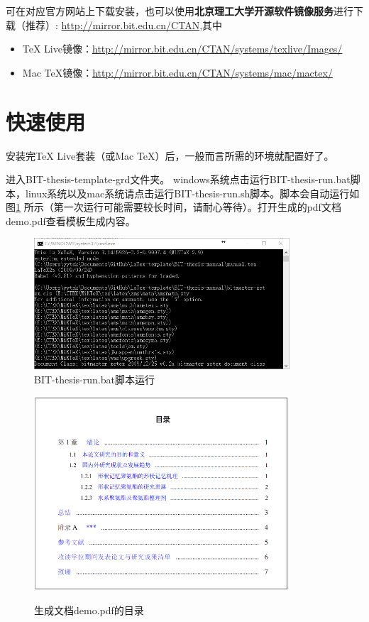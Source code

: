 可在对应官方网站上下载安装，也可以使用\textbf{北京理工大学开源软件镜像服务}进行下载（推荐）: \url{http://mirror.bit.edu.cn/CTAN},其中
\begin{itemize}
\item TeX Live镜像：\url{http://mirror.bit.edu.cn/CTAN/systems/texlive/Images/}
\item Mac TeX镜像：\url{http://mirror.bit.edu.cn/CTAN/systems/mac/mactex/}
\end{itemize}



\section{快速使用}
\label{sec:process}

安装完TeX Live套装（或Mac TeX）后，一般而言所需的环境就配置好了。

进入BIT-thesis-template-grd文件夹。
windows系统点击运行BIT-thesis-run.bat脚本，linux系统以及mac系统请点击运行BIT-thesis-run.sh脚本。脚本会自动运行如图\ref{fig:run} 所示（第一次运行可能需要较长时间，请耐心等待）。打开生成的pdf文档demo.pdf查看模板生成内容。
 
\begin{figure}[!htp]
  \centering
  \includegraphics[width=0.85\textwidth]{figures/BIT-thesis-run}
  \caption{BIT-thesis-run.bat脚本运行}
  \label{fig:run}
\end{figure}


\begin{figure}[!htp]
  \centering
  {\includegraphics[width=0.85\textwidth]{figures/demo_context}}
  \caption{生成文档demo.pdf的目录}
  \label{fig:demo_context}
\end{figure}

